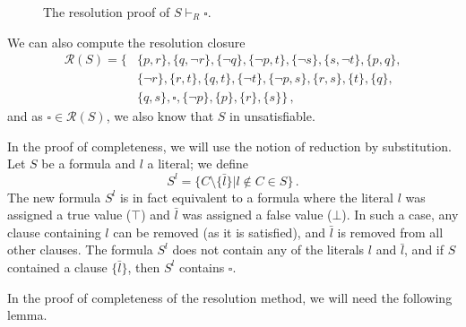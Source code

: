 \begin{figure}
\centering
{}
\caption{The resolution proof of $S \vdash_R \square$.}
\end{figure}

We can also compute the resolution closure 
\begin{align*}
\mathcal{R}(S) =  \{ & \{p, r\}, \{q, \neg r\}, \{\neg q\}, \{\neg p, t\}, \{\neg s\}, \{s, \neg t\}, \{p, q\}, \\ 
& \{\neg r\}, \{r,t\}, \{q,t\}, \{\neg t\}, \{\neg p, s\}, \{r,s\}, \{t\}, \{q\}, \\ 
& \{q,s\}, \square, \{\neg p\}, \{p\}, \{r\}, \{s\}\}\,,
\end{align*}
and as $\square \in \mathcal{R}(S)$, we also know that $S$ in unsatisfiable.

In the proof of completeness, we will use the notion of reduction by substitution. Let $S$ be a formula and $l$ a literal; we define $$S^l = \{C \setminus \{\bar{l}\}| l \notin C \in S\}\,.$$ The new formula $S^l$ is in fact equivalent to a formula where the literal $l$ was assigned a true value ($\top$) and $\bar{l}$ was assigned a false value ($\bot$). In such a case, any clause containing $l$ can be removed (as it is satisfied), and $\bar{l}$ is removed from all other clauses. The formula $S^l$ does not contain any of the literals $l$ and $\bar{l}$, and if $S$ contained a clause $\{\bar{l}\}$, then $S^l$ contains $\square$.

In the proof of completeness of the resolution method, we will need the following lemma.

